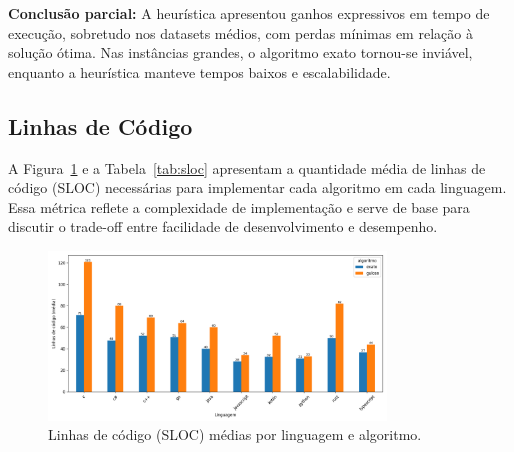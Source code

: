 \documentclass[12pt, a4paper]{article}
\begin{document}
\textbf{Conclusão parcial:} A heurística apresentou ganhos expressivos em tempo de execução, sobretudo nos datasets médios, com perdas mínimas em relação à solução ótima. Nas instâncias grandes, o algoritmo exato tornou-se inviável, enquanto a heurística manteve tempos baixos e escalabilidade.

\subsection{Linhas de Código}

A Figura~\ref{fig:sloc} e a Tabela~\ref{tab:sloc} apresentam a quantidade média de linhas de código (SLOC) necessárias para implementar cada algoritmo em cada linguagem. Essa métrica reflete a complexidade de implementação e serve de base para discutir o trade-off entre facilidade de desenvolvimento e desempenho.

\begin{figure}[H]
    \centering
    \includegraphics[width=0.8\textwidth]{img/linhas_codigo_linguagem_algoritmo.png}
    \caption{Linhas de código (SLOC) médias por linguagem e algoritmo.}
    \label{fig:sloc}
\end{figure}

\begin{table}[H]
    \centering
    \caption{Linhas de código (SLOC) médias por linguagem e algoritmo.}
    \label{tab:sloc}
\end{table}
\end{document}
